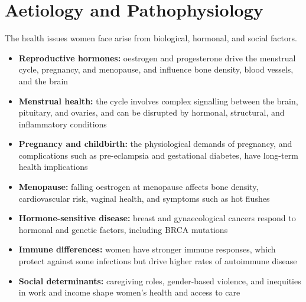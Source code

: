 \section*{Aetiology and Pathophysiology}
The health issues women face arise from biological, hormonal, and social factors.
\begin{itemize}
    \item \textbf{Reproductive hormones:} oestrogen and progesterone drive the menstrual cycle, pregnancy, and menopause, and influence bone density, blood vessels, and the brain
    \item \textbf{Menstrual health:} the cycle involves complex signalling between the brain, pituitary, and ovaries, and can be disrupted by hormonal, structural, and inflammatory conditions
    \item \textbf{Pregnancy and childbirth:} the physiological demands of pregnancy, and complications such as pre-eclampsia and gestational diabetes, have long-term health implications
    \item \textbf{Menopause:} falling oestrogen at menopause affects bone density, cardiovascular risk, vaginal health, and symptoms such as hot flushes
    \item \textbf{Hormone-sensitive disease:} breast and gynaecological cancers respond to hormonal and genetic factors, including BRCA mutations
    \item \textbf{Immune differences:} women have stronger immune responses, which protect against some infections but drive higher rates of autoimmune disease
    \item \textbf{Social determinants:} caregiving roles, gender-based violence, and inequities in work and income shape women's health and access to care
\end{itemize}

